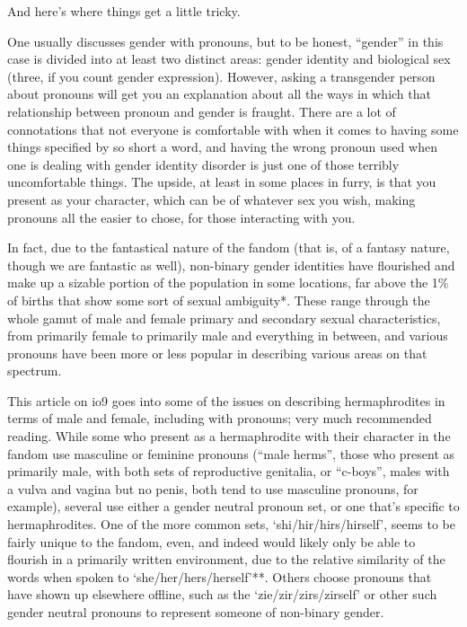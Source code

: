 And here's where things get a little tricky.

One usually discusses gender with pronouns, but to be honest, ``gender'' in this case is divided into at least two distinct areas: gender identity and biological sex (three, if you count gender expression). However, asking a transgender person about pronouns will get you an explanation about all the ways in which that relationship between pronoun and gender is fraught. There are a lot of connotations that not everyone is comfortable with when it comes to having some things specified by so short a word, and having the wrong pronoun used when one is dealing with gender identity disorder is just one of those terribly uncomfortable things. The upside, at least in some places in furry, is that you present as your character, which can be of whatever sex you wish, making pronouns all the easier to chose, for those interacting with you.

In fact, due to the fantastical nature of the fandom (that is, of a fantasy nature, though we are fantastic as well), non-binary gender identities have flourished and make up a sizable portion of the population in some locations, far above the 1\% of births that show some sort of sexual ambiguity*. These range through the whole gamut of male and female primary and secondary sexual characteristics, from primarily female to primarily male and everything in between, and various pronouns have been more or less popular in describing various areas on that spectrum.

This article on io9 goes into some of the issues on describing hermaphrodites in terms of male and female, including with pronouns; very much recommended reading. While some who present as a hermaphrodite with their character in the fandom use masculine or feminine pronouns (``male herms'', those who present as primarily male, with both sets of reproductive genitalia, or ``c-boys'', males with a vulva and vagina but no penis, both tend to use masculine pronouns, for example), several use either a gender neutral pronoun set, or one that's specific to hermaphrodites. One of the more common sets, `shi/hir/hirs/hirself', seems to be fairly unique to the fandom, even, and indeed would likely only be able to flourish in a primarily written environment, due to the relative similarity of the words when spoken to `she/her/hers/herself'**. Others choose pronouns that have shown up elsewhere offline, such as the `zie/zir/zirs/zirself' or other such gender neutral pronouns to represent someone of non-binary gender.

